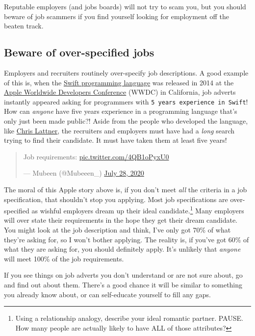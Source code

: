 \documentclass[
]{book}
\begin{document}
Reputable employers (and jobs boards) will not try to scam you, but you should beware of job scammers if you find yourself looking for employment off the beaten track.

\hypertarget{overspec}{%
\subsection{Beware of over-specified jobs}\label{overspec}}

Employers and recruiters routinely over-specify job descriptions. A good example of this is, when the \href{https://en.wikipedia.org/wiki/Swift_(programming_language)}{Swift programming language} was released in 2014 at the \href{https://en.wikipedia.org/wiki/Apple_Worldwide_Developers_Conference}{Apple Worldwide Developers Conference} (WWDC) in California, job adverts instantly appeared asking for programmers with \texttt{5\ years\ experience\ in\ Swift}! How can \emph{anyone} have five years experience in a programming language that's only just been made public?! Aside from the people who developed the language, like \href{https://en.wikipedia.org/wiki/Chris_Lattner}{Chris Lattner}, the recruiters and employers must have had a \emph{long} search trying to find their candidate. It must have taken them at least five years!

\begin{quote}
Job requirements:
\href{https://t.co/4QB1oPyxU0}{pic.twitter.com/4QB1oPyxU0}

--- Mubeen (@Mubeeen\_) \href{https://twitter.com/Mubeeen_/status/1288115932154363905}{July 28,
2020}
\end{quote}

The moral of this Apple story above is, if you don't meet \emph{all} the criteria in a job specification, that shouldn't stop you applying. Most job specifications are over-specified as wishful employers dream up their ideal candidate.\footnote{Using a relationship analogy, describe your ideal romantic partner. PAUSE. How many people are actually likely to have ALL of those attributes?} Many employers will over state their requirements in the hope they get their dream candidate. You might look at the job description and think, I've only got 70\% of what they're asking for, so I won't bother applying. The reality is, if you've got 60\% of what they are asking for, you should definitely apply. It's unlikely that \emph{anyone} will meet 100\% of the job requirements.

If you see things on job adverts you don't understand or are not sure about, go and find out about them. There's a good chance it will be similar to something you already know about, or can self-educate yourself to fill any gaps.
\end{document}
